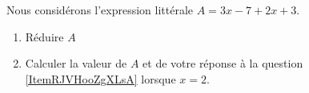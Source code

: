 
\begin{exercice}\label{exo2smath-0276}

    Nous considérons l'expression littérale \( A=3x-7+2x+3\).
    \begin{enumerate}
        \item   \label{ItemRJVHooZgXLsA}
            Réduire \( A\)
        \item
            Calculer la valeur de \( A\) et de votre réponse à la question \ref{ItemRJVHooZgXLsA} lorsque \( x=2\).
    \end{enumerate}

\end{exercice}

